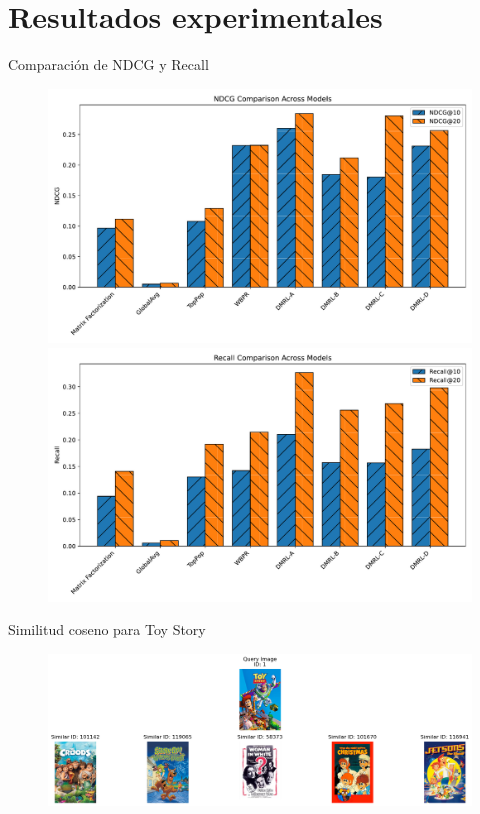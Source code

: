 \documentclass{beamer}
\begin{document}
\section{Resultados experimentales}
\begin{frame}{Comparación de NDCG y Recall}
    \begin{figure}
        \centering
        \begin{minipage}{0.48\textwidth}
            \includegraphics[width=\textwidth]{images/ndcg_comparison.pdf}
        \end{minipage}
        \hfill
        \begin{minipage}{0.48\textwidth}
            \includegraphics[width=\textwidth]{images/recall_comparison.pdf}
        \end{minipage}
    \end{figure}
\end{frame}

\begin{frame}{Similitud coseno para Toy Story}
    \begin{figure}
        \includegraphics[width=\textwidth]{images/vgg16_cnn_nopca.png}
    \end{figure}
\end{frame}
\end{document}
